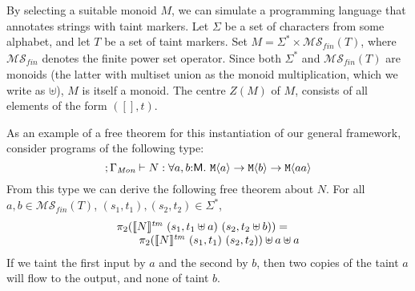 By selecting a suitable monoid $M$, we can simulate a programming
language that annotates strings with taint markers. Let $\Sigma$ be a
set of characters from some alphabet, and let $T$ be a set of taint
markers. Set $M = \Sigma^* \times \mathcal{MS}_{\mathit{fin}}(T)$,
where $\mathcal{MS}_{\mathit{fin}}$ denotes the finite power set
operator. Since both $\Sigma^*$ and $\mathcal{MS}_{\mathit{fin}}(T)$
are monoids (the latter with multiset union as the monoid
multiplication, which we write as $\uplus$), $M$ is itself a
monoid. The centre $Z(M)$ of $M$, consists of all elements of the form
$([], t)$.

As an example of a free theorem for this instantiation of our general
framework, consider programs of the following type:
\begin{displaymath}
  ; \Gamma_{\textit{Mon}} \vdash N : \forall a,b\mathord:\mathsf{M}.\ \textup{\texttt{M}}\langle a \rangle \to \textup{\texttt{M}}\langle b \rangle \to \textup{\texttt{M}}\langle aa \rangle
\end{displaymath}
From this type we can derive the following free theorem about $N$. For
all $a, b \in \mathcal{MS}_{\mathit{fin}}(T)$, $(s_1,t_1), (s_2,t_2)
\in \Sigma^*$,
\begin{displaymath}
  \begin{array}{l}
    \pi_2(\llbracket N \rrbracket^{\mathit{tm}}\ (s_1,t_1 \uplus a)\ (s_2,t_2 \uplus b)) = \\
    \hspace{2em}\pi_2(\llbracket N \rrbracket^{\mathit{tm}}\ (s_1,t_1)\ (s_2,t_2)) \uplus a \uplus a
  \end{array}
\end{displaymath}
If we taint the first input by $a$ and the second by $b$, then two
copies of the taint $a$ will flow to the output, and none of taint
$b$.






